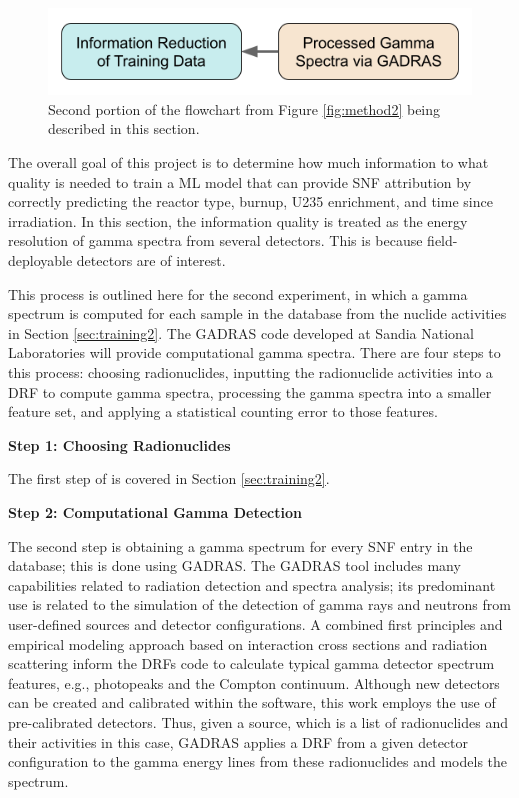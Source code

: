 
\begin{figure}[H]
  \centering
  \includegraphics[width=0.7\linewidth]{./chapters/exp2/methodology2_2.png}
  \caption[Second portion of the flowchart from Figure \ref{fig:method2}]
          {Second portion of the flowchart from Figure \ref{fig:method2} being 
           described in this section.}
\end{figure}

The overall goal of this project is to determine how much information to what
quality is needed to train a  \gls{ML} model that can provide \gls{SNF}
attribution by correctly predicting the reactor type, burnup, \gls{U235}
enrichment, and time since irradiation.  In this section, the information
quality is treated as the energy resolution of gamma spectra from several
detectors.  This is because field-deployable detectors are of interest.

This process is outlined here for the second experiment, in which a gamma
spectrum is computed for each sample in the database from the nuclide
activities in Section \ref{sec:training2}.  The \gls{GADRAS} code \cite{gadras}
developed at Sandia National Laboratories will provide computational gamma
spectra. There are four steps to this process: choosing radionuclides,
inputting the radionuclide activities into a \gls{DRF} to compute gamma
spectra, processing the gamma spectra into a smaller feature set, and applying
a statistical counting error to those features.

\noindent \textbf{Step 1: Choosing Radionuclides}

The first step of is covered in Section \ref{sec:training2}.  

\noindent \textbf{Step 2: Computational Gamma Detection}

The second step is obtaining a gamma spectrum for every \gls{SNF} entry in the
database; this is done using \gls{GADRAS}. The \gls{GADRAS} tool includes many
capabilities related to radiation detection and spectra analysis; its
predominant use is related to the simulation of the detection of gamma rays and
neutrons from user-defined sources and detector configurations.  A combined
first principles and empirical modeling approach based on interaction cross
sections and radiation scattering inform the \glspl{DRF} code to calculate
typical gamma detector spectrum features, e.g., photopeaks and the Compton
continuum.  Although new detectors can be created and calibrated within the
software, this work employs the use of pre-calibrated detectors.  Thus, given a
source, which is a list of radionuclides and their activities in this case,
\gls{GADRAS} applies a \gls{DRF} from a given detector configuration to the
gamma energy lines from these radionuclides and models the spectrum.
\cite{gadras} 

